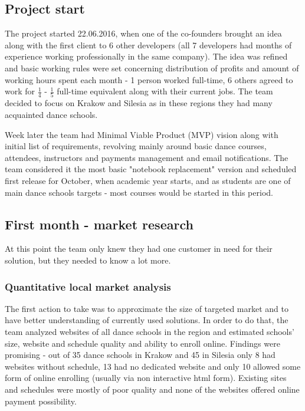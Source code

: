 \documentclass{article}
\begin{document}
\subsection{Project start}
The project started 22.06.2016, when one of the co-founders brought an idea along with the first client to 6 other developers (all 7 developers had months of experience working professionally in the same company). The idea was refined and basic working rules were set concerning distribution of profits and amount of working hours spent each month - 1 person worked full-time, 6 others agreed to work for \( \frac{1}{4} \) - \( \frac{1}{5} \) full-time equivalent along with their current jobs. The team decided to focus on Krakow and Silesia as in these regions they had many acquainted dance schools.

Week later the team had Minimal Viable Product (MVP) vision along with initial list of requirements, revolving mainly around basic dance courses, attendees, instructors and payments management and email notifications. The team considered it the most basic "notebook replacement" version and scheduled first release for October, when academic year starts, and as students are one of main dance schools targets - most courses would be started in this period.

\subsection{First month - market research}
At this point the team only knew they had one customer in need for their solution, but they needed to know a lot more.

\subsubsection{Quantitative local market analysis}
The first action to take was to approximate the size of targeted market and to have better understanding of currently used solutions. In order to do that, the team analyzed websites of all dance schools in the region and estimated schools' size, website and schedule quality and ability to enroll online. Findings were promising - out of 35 dance schools in Krakow and 45 in Silesia only 8 had websites without schedule, 13 had no dedicated website and only 10 allowed some form of online enrolling (usually via non interactive html form). Existing sites and schedules were mostly of poor quality and none of the websites offered online payment possibility.
\end{document}
